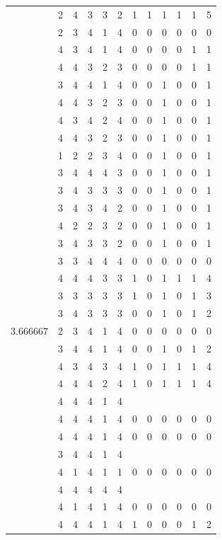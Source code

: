\documentclass[]{book}
\theoremstyle{definition}
\theoremstyle{definition}
\theoremstyle{definition}
\theoremstyle{remark}
\begin{document}
\begin{table}
{\begin{tabular}[t]{rrrrrrrrrrrr}
 & 2 & 4 & 3 & 3 & 2 & 1 & 1 & 1 & 1 & 1 & 5\\
 & 2 & 3 & 4 & 1 & 4 & 0 & 0 & 0 & 0 & 0 & 0\\
 & 4 & 3 & 4 & 1 & 4 & 0 & 0 & 0 & 0 & 1 & 1\\
 & 4 & 4 & 3 & 2 & 3 & 0 & 0 & 0 & 0 & 1 & 1\\
 & 3 & 4 & 4 & 1 & 4 & 0 & 0 & 1 & 0 & 0 & 1\\
 & 4 & 4 & 3 & 2 & 3 & 0 & 0 & 1 & 0 & 0 & 1\\
 & 4 & 3 & 4 & 2 & 4 & 0 & 0 & 1 & 0 & 0 & 1\\
 & 4 & 4 & 3 & 2 & 3 & 0 & 0 & 1 & 0 & 0 & 1\\
 & 1 & 2 & 2 & 3 & 4 & 0 & 0 & 1 & 0 & 0 & 1\\
 & 3 & 4 & 4 & 4 & 3 & 0 & 0 & 1 & 0 & 0 & 1\\
 & 3 & 4 & 3 & 3 & 3 & 0 & 0 & 1 & 0 & 0 & 1\\
 & 3 & 4 & 3 & 4 & 2 & 0 & 0 & 1 & 0 & 0 & 1\\
 & 4 & 2 & 2 & 3 & 2 & 0 & 0 & 1 & 0 & 0 & 1\\
 & 3 & 4 & 3 & 3 & 2 & 0 & 0 & 1 & 0 & 0 & 1\\
 & 3 & 3 & 4 & 4 & 4 & 0 & 0 & 0 & 0 & 0 & 0\\
 & 4 & 4 & 4 & 3 & 3 & 1 & 0 & 1 & 1 & 1 & 4\\
 & 3 & 3 & 3 & 3 & 3 & 1 & 0 & 1 & 0 & 1 & 3\\
 & 3 & 4 & 3 & 3 & 3 & 0 & 0 & 1 & 0 & 1 & 2\\
3.666667 & 2 & 3 & 4 & 1 & 4 & 0 & 0 & 0 & 0 & 0 & 0\\
 & 3 & 4 & 4 & 1 & 4 & 0 & 0 & 1 & 0 & 1 & 2\\
 & 4 & 3 & 4 & 3 & 4 & 1 & 0 & 1 & 1 & 1 & 4\\
 & 4 & 4 & 4 & 2 & 4 & 1 & 0 & 1 & 1 & 1 & 4\\
 & 4 & 4 & 4 & 1 & 4 &  &  &  &  &  & \\
 & 4 & 4 & 4 & 1 & 4 & 0 & 0 & 0 & 0 & 0 & 0\\
 & 4 & 4 & 4 & 1 & 4 & 0 & 0 & 0 & 0 & 0 & 0\\
 & 3 & 4 & 4 & 1 & 4 &  &  &  &  &  & \\
 & 4 & 1 & 4 & 1 & 1 & 0 & 0 & 0 & 0 & 0 & 0\\
 & 4 & 4 & 4 & 4 & 4 &  &  &  &  &  & \\
 & 4 & 1 & 4 & 1 & 4 & 0 & 0 & 0 & 0 & 0 & 0\\
 & 4 & 4 & 4 & 1 & 4 & 1 & 0 & 0 & 0 & 1 & 2\\

\end{tabular}}
\end{table}
\end{document}
